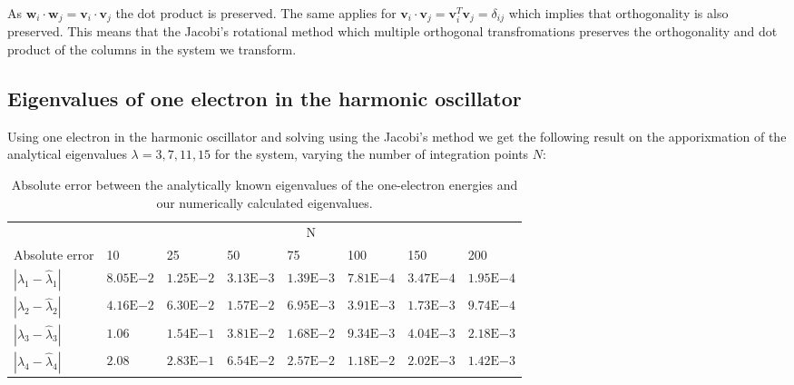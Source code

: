 \documentclass[a4paper, fontsize=11pt]{article}
\begin{document}
As $\textbf{w}_{i} \cdot \textbf{w}_{j} = \textbf{v}_{i} \cdot \textbf{v}_{j}$ the dot product is preserved. The same applies for $\textbf{v}_{i} \cdot \textbf{v}_{j} = \textbf{v}^T_{i} \textbf{v}_{j} = \delta_{ij}$ which implies that orthogonality is also preserved. This means that the Jacobi's rotational method which multiple orthogonal transfromations preserves the orthogonality and dot product of the columns in the system we transform.

\subsection{Eigenvalues of one electron in the harmonic oscillator}

Using one electron in the harmonic oscillator and solving using the Jacobi's method we get the following result on the apporixmation of the analytical eigenvalues $\lambda = 3, 7, 11, 15$ for the system, varying the number of integration points $N$:

\begin{table}[htp]
\begin{center}
\begin{tabular}{@{}llllllll@{}}
\toprule
     & \multicolumn{7}{c}{N}               \\ \cmidrule(l){2-8} 
Absolute error & 10 & 25 & 50 & 75 & 100 & 150 & 200 \\ \midrule
$|\lambda_1 - \hat{\lambda}_1|$    &    $8.05\mathrm{E}{-2}$&    $1.25\mathrm{E}{-2}$&    $3.13\mathrm{E}{-3}$&    $1.39\mathrm{E}{-3}$&     $7.81\mathrm{E}{-4}$&     $3.47\mathrm{E}{-4}$&      $1.95\mathrm{E}{-4}$\\
$|\lambda_2 - \hat{\lambda}_2|$    &    $4.16\mathrm{E}{-2}$&    $6.30\mathrm{E}{-2}$&    $1.57\mathrm{E}{-2}$&    $6.95\mathrm{E}{-3}$&     $3.91\mathrm{E}{-3}$&     $1.73\mathrm{E}{-3}$&      $9.74\mathrm{E}{-4}$\\
$|\lambda_3 - \hat{\lambda}_3|$    &    $1.06$&    $1.54\mathrm{E}{-1}$&    $3.81\mathrm{E}{-2}$&    $1.68\mathrm{E}{-2}$&     $9.34\mathrm{E}{-3}$&     $4.04\mathrm{E}{-3}$&     $2.18\mathrm{E}{-3}$\\
$|\lambda_4 - \hat{\lambda}_4|$    &    $2.08$&    $2.83\mathrm{E}{-1}$&    $6.54\mathrm{E}{-2}$&    $2.57\mathrm{E}{-2}$&     $1.18\mathrm{E}{-2}$&     $2.02\mathrm{E}{-3}$&     $1.42\mathrm{E}{-3}$\\ \bottomrule
\end{tabular}
\caption{Absolute error between the analytically known eigenvalues of the one-electron energies and our numerically calculated eigenvalues.}
\end{center}
\end{table}
\end{document}
